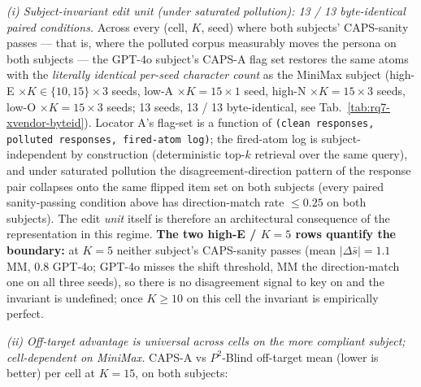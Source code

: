 \textit{(i) Subject-invariant edit unit (under saturated pollution): 13 / 13 byte-identical paired conditions.} Across every (cell, $K$, seed) where both subjects' CAPS-sanity passes --- that is, where the polluted corpus measurably moves the persona on both subjects --- the GPT-4o subject's CAPS-A flag set restores the same atoms with the \textit{literally identical per-seed character count} as the MiniMax subject (high-E $\times K{\in}\{10,15\}\times 3$ seeds, low-A $\times K{=}15\times 1$ seed, high-N $\times K{=}15\times 3$ seeds, low-O $\times K{=}15\times 3$ seeds; 13 seeds, 13 / 13 byte-identical, see Tab.~\ref{tab:rq7-xvendor-byteid}). Locator A's flag-set is a function of \texttt{(clean responses,\allowbreak{} polluted responses,\allowbreak{} fired-\allowbreak{}atom log)}; the fired-atom log is subject-independent by construction (deterministic top-$k$ retrieval over the same query), and under saturated pollution the disagreement-direction pattern of the response pair collapses onto the same flipped item set on both subjects (every paired sanity-passing condition above has direction-match rate $\leq 0.25$ on both subjects). The edit \textit{unit} itself is therefore an architectural consequence of the representation in this regime. \textbf{The two high-E / $K=5$ rows quantify the boundary:} at $K=5$ neither subject's CAPS-sanity passes (mean $|\Delta\bar{s}| = 1.1$ MM, $0.8$ GPT-4o; GPT-4o misses the shift threshold, MM the direction-match one on all three seeds), so there is no disagreement signal to key on and the invariant is undefined; once $K\geq 10$ on this cell the invariant is empirically perfect.

\textit{(ii) Off-target advantage is universal across cells on the more compliant subject; cell-dependent on MiniMax.} CAPS-A vs $P^{\!2}$-Blind off-target mean (lower is better) per cell at $K=15$, on both subjects:

